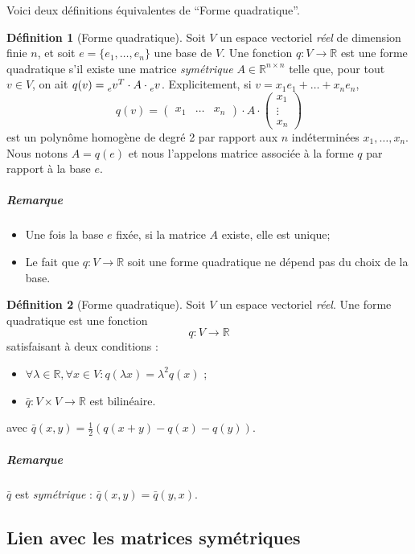 \documentclass[11pt,a4paper]{article}
\theoremstyle{definition}
\newtheorem{mydef}{Définition}%
\newcommand{\R}{\mathbb{R}}
\newcommand{\Rnn}{\R^{n \times n}}
\begin{document}
Voici deux définitions équivalentes de ``Forme quadratique''.

\begin{mydef}[Forme quadratique]
	Soit $V$ un espace vectoriel \emph{réel} de dimension finie $n$,
	et soit $e = \{e_1, \dots, e_n\}$ une base de $V$.
	Une fonction $q: V \to \R$ est une forme quadratique s'il existe
	une matrice \emph{symétrique} $A \in \Rnn$ telle que, pour tout $v \in V$,
	on ait $q(v) = \tensor[_e]{v}{^T} \cdot A \cdot \tensor[_e]{v}{}$.
	Explicitement, si $v = x_1e_1 + \dots + x_ne_n$,
	\[ q(v) = \begin{pmatrix}x_1 & \dots & x_n\end{pmatrix} \cdot A \cdot \begin{pmatrix}x_1\\\vdots\\x_n\end{pmatrix} \]
	est un polynôme homogène de degré 2 par rapport aux $n$ indéterminées $x_1, \dots, x_n$.
	Nous notons $A = q(e)$ et nous l'appelons matrice associée à la forme $q$ par rapport à la base $e$.
	\subparagraph{Remarque}
	\begin{itemize}
		\item Une fois la base $e$ fixée, si la matrice $A$ existe, elle est unique;
		\item Le fait que $q: V \to \R$ soit une forme quadratique ne dépend pas du choix de la base.
	\end{itemize}
\end{mydef}

\begin{mydef}[Forme quadratique]
	Soit $V$ un espace vectoriel \emph{réel}.
	Une forme quadratique est une fonction
	\[ q : V \rightarrow \R \]
	satisfaisant à deux conditions :
	\begin{itemize}
		\item $\forall \lambda \in \R, \forall x \in V : q(\lambda x) = \lambda^2 q(x)$ ;
		\item $\bar{q} : V \times V \rightarrow \R$ est bilinéaire.
	\end{itemize}
	avec $\bar{q}(x,y) = \frac 12 (q(x+y) - q(x) - q(y) )$.
	\subparagraph{Remarque}
	$\bar{q}$ est \emph{symétrique} : $\bar{q}(x,y) = \bar{q}(y,x)$.
\end{mydef}

\subsection{Lien avec les matrices symétriques}
\end{document}

